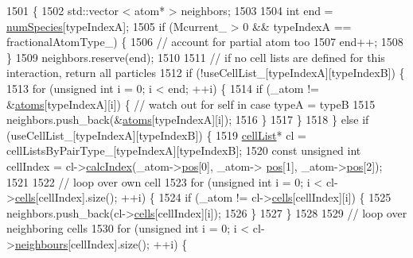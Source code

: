 \begin{DoxyCode}
1501                                                                                                            
                    \{
1502     std::vector < atom* > neighbors;
1503 
1504     \textcolor{keywordtype}{int} end = \hyperlink{classsim_system_a9eea865e6dc1cff377b1e79c4d9c23f0}{numSpecies}[typeIndexA];
1505     \textcolor{keywordflow}{if} (Mcurrent\_ > 0 && typeIndexA == fractionalAtomType\_) \{
1506         \textcolor{comment}{// account for partial atom too}
1507         end++;
1508     \}
1509     neighbors.reserve(end);
1510 
1511     \textcolor{comment}{// if no cell lists are defined for this interaction, return all particles}
1512     \textcolor{keywordflow}{if} (!useCellList\_[typeIndexA][typeIndexB]) \{
1513         \textcolor{keywordflow}{for} (\textcolor{keywordtype}{unsigned} \textcolor{keywordtype}{int} i = 0; i < end; ++i) \{
1514             \textcolor{keywordflow}{if} (\_atom != &\hyperlink{classsim_system_a90421b19082f7fb8fc23b7264b1161e4}{atoms}[typeIndexA][i]) \{ \textcolor{comment}{// watch out for self in case typeA = typeB}
1515                 neighbors.push\_back(&\hyperlink{classsim_system_a90421b19082f7fb8fc23b7264b1161e4}{atoms}[typeIndexA][i]);
1516             \}
1517         \}
1518     \} \textcolor{keywordflow}{else} \textcolor{keywordflow}{if} (useCellList\_[typeIndexA][typeIndexB]) \{
1519         \hyperlink{classcell_list}{cellList}* cl = cellListsByPairType\_[typeIndexA][typeIndexB];
1520         \textcolor{keyword}{const} \textcolor{keywordtype}{unsigned} \textcolor{keywordtype}{int} cellIndex = cl->\hyperlink{classcell_list_aa6b843131cd487164a137571c7343cab}{calcIndex}(\_atom->\hyperlink{classatom_a3ae5f4880e7831d8b2c9fda72b4eb24a}{pos}[0], \_atom->
      \hyperlink{classatom_a3ae5f4880e7831d8b2c9fda72b4eb24a}{pos}[1], \_atom->\hyperlink{classatom_a3ae5f4880e7831d8b2c9fda72b4eb24a}{pos}[2]);
1521 
1522         \textcolor{comment}{// loop over own cell}
1523         \textcolor{keywordflow}{for} (\textcolor{keywordtype}{unsigned} \textcolor{keywordtype}{int} i = 0; i < cl->\hyperlink{classcell_list_a10bc0c3ae819293b1e88bc7d1bfdb2aa}{cells}[cellIndex].size(); ++i) \{
1524             \textcolor{keywordflow}{if} (\_atom != cl->\hyperlink{classcell_list_a10bc0c3ae819293b1e88bc7d1bfdb2aa}{cells}[cellIndex][i]) \{
1525                 neighbors.push\_back(cl->\hyperlink{classcell_list_a10bc0c3ae819293b1e88bc7d1bfdb2aa}{cells}[cellIndex][i]);
1526             \}
1527         \}
1528 
1529         \textcolor{comment}{// loop over neighboring cells}
1530         \textcolor{keywordflow}{for} (\textcolor{keywordtype}{unsigned} \textcolor{keywordtype}{int} i = 0; i < cl->\hyperlink{classcell_list_ada607886d0e5a20d710dde694d6d989f}{neighbours}[cellIndex].size(); ++i) \{

\end{DoxyCode}
